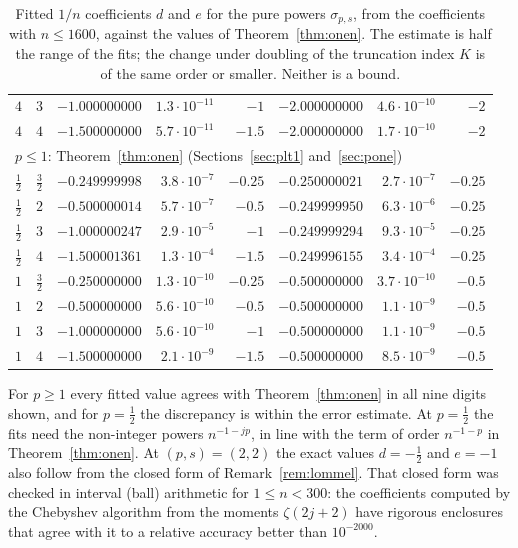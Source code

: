 \begin{table}[ht]
\begin{tabular}{rrrrrrrr}
$4$ & $3$ & $-1.000000000$ & $1.3\cdot10^{-11}$ & $-1$ & $-2.000000000$ & $4.6\cdot10^{-10}$ & $-2$\\
$4$ & $4$ & $-1.500000000$ & $5.7\cdot10^{-11}$ & $-1.5$ & $-2.000000000$ & $1.7\cdot10^{-10}$ & $-2$\\
\midrule
\multicolumn{8}{l}{$p\le1$: Theorem~\ref{thm:onen} (Sections~\ref{sec:plt1} and~\ref{sec:pone})}\\
$\frac12$ & $\frac32$ & $-0.249999998$ & $3.8\cdot10^{-7}$ & $-0.25$ & $-0.250000021$ & $2.7\cdot10^{-7}$ & $-0.25$\\
$\frac12$ & $2$ & $-0.500000014$ & $5.7\cdot10^{-7}$ & $-0.5$ & $-0.249999950$ & $6.3\cdot10^{-6}$ & $-0.25$\\
$\frac12$ & $3$ & $-1.000000247$ & $2.9\cdot10^{-5}$ & $-1$ & $-0.249999294$ & $9.3\cdot10^{-5}$ & $-0.25$\\
$\frac12$ & $4$ & $-1.500001361$ & $1.3\cdot10^{-4}$ & $-1.5$ & $-0.249996155$ & $3.4\cdot10^{-4}$ & $-0.25$\\
$1$ & $\frac32$ & $-0.250000000$ & $1.3\cdot10^{-10}$ & $-0.25$ & $-0.500000000$ & $3.7\cdot10^{-10}$ & $-0.5$\\
$1$ & $2$ & $-0.500000000$ & $5.6\cdot10^{-10}$ & $-0.5$ & $-0.500000000$ & $1.1\cdot10^{-9}$ & $-0.5$\\
$1$ & $3$ & $-1.000000000$ & $5.6\cdot10^{-10}$ & $-1$ & $-0.500000000$ & $1.1\cdot10^{-9}$ & $-0.5$\\
$1$ & $4$ & $-1.500000000$ & $2.1\cdot10^{-9}$ & $-1.5$ & $-0.500000000$ & $8.5\cdot10^{-9}$ & $-0.5$\\
\bottomrule
\end{tabular}
\caption{Fitted $1/n$ coefficients $d$ and $e$ for the pure powers $\sigma_{p,s}$, from the coefficients with
$n\le1600$, against the values of Theorem~\ref{thm:onen}. The
estimate is half the range of the fits; the change under doubling of the truncation index $K$ is of the same order or
smaller. Neither is a bound.}
\label{tab:onen}
\end{table}

For $p\ge1$ every fitted value agrees with Theorem~\ref{thm:onen} in all nine digits shown, and for $p=\frac12$ the
discrepancy is within the error estimate. At $p=\frac12$ the fits need the non-integer powers $n^{-1-jp}$, in line
with the term of order $n^{-1-p}$ in Theorem~\ref{thm:onen}. At $(p,s)=(2,2)$ the exact values
$d=-\frac12$ and $e=-1$ also follow from the closed form of Remark~\ref{rem:lommel}. That closed form was checked in
interval (ball) arithmetic for $1\le n<300$: the coefficients computed by the Chebyshev algorithm from the moments
$\zeta(2j+2)$ have rigorous enclosures that agree with it to a relative accuracy better than $10^{-2000}$.

